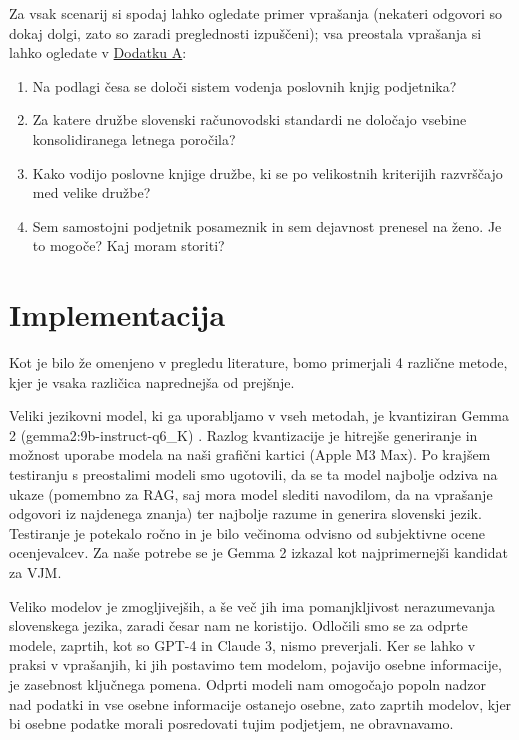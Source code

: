 \documentclass[a4paper,12pt,openright]{book}
\begin{document}
Za vsak scenarij si spodaj lahko ogledate primer vprašanja (nekateri odgovori so dokaj dolgi, zato so zaradi preglednosti izpuščeni); vsa preostala vprašanja si lahko ogledate v \hyperref[appendix_a]{Dodatku A}:

\begin{enumerate}
	\item Na podlagi česa se določi sistem vodenja poslovnih knjig podjetnika?
	\item Za katere družbe slovenski računovodski standardi ne določajo vsebine konsolidiranega letnega poročila?
	\item Kako vodijo poslovne knjige družbe, ki se po velikostnih kriterijih razvrščajo med velike družbe?
	\item Sem samostojni podjetnik posameznik in sem dejavnost prenesel na ženo. Je to mogoče? Kaj moram storiti?
\end{enumerate}

\chapter{Implementacija}
\label{ch3}

Kot je bilo že omenjeno v pregledu literature, bomo primerjali 4 različne metode, kjer je vsaka različica naprednejša od prejšnje.

Veliki jezikovni model, ki ga uporabljamo v vseh metodah, je kvantiziran Gemma 2 (gemma2:9b-instruct-q6\_K) \cite{gemma2}. Razlog kvantizacije je hitrejše generiranje in možnost uporabe modela na naši grafični kartici (Apple M3 Max). Po krajšem testiranju s preostalimi modeli smo ugotovili, da se ta model najbolje odziva na ukaze (pomembno za RAG, saj mora model slediti navodilom, da na vprašanje odgovori iz najdenega znanja) ter najbolje razume in generira slovenski jezik. Testiranje je potekalo ročno in je bilo večinoma odvisno od subjektivne ocene ocenjevalcev. Za naše potrebe se je Gemma 2 izkazal kot najprimernejši kandidat za VJM.

Veliko modelov je zmogljivejših, a še več jih ima pomanjkljivost nerazumevanja slovenskega jezika, zaradi česar nam ne koristijo. Odločili smo se za odprte modele, zaprtih, kot so GPT-4 in Claude 3, nismo preverjali. Ker se lahko v praksi v vprašanjih, ki jih postavimo tem modelom, pojavijo osebne informacije, je zasebnost ključnega pomena. Odprti modeli nam omogočajo popoln nadzor nad podatki in vse osebne informacije ostanejo osebne, zato zaprtih modelov, kjer bi osebne podatke morali posredovati tujim podjetjem, ne obravnavamo.
\end{document}
